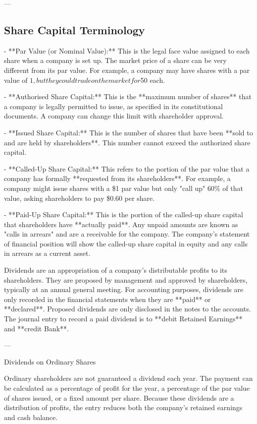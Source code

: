 ---

\subsection{Share Capital Terminology}

- **Par Value (or Nominal Value):** This is the legal face value assigned to each share when a company is set up. The market price of a share can be very different from its par value. For example, a company may have shares with a par value of $1, but they could trade on the market for $50 each.
    
- **Authorised Share Capital:** This is the **maximum number of shares** that a company is legally permitted to issue, as specified in its constitutional documents. A company can change this limit with shareholder approval.
    
- **Issued Share Capital:** This is the number of shares that have been **sold to and are held by shareholders**. This number cannot exceed the authorized share capital.
    
- **Called-Up Share Capital:** This refers to the portion of the par value that a company has formally **requested from its shareholders**. For example, a company might issue shares with a \$1 par value but only "call up" 60\% of that value, asking shareholders to pay \$0.60 per share.
    
- **Paid-Up Share Capital:** This is the portion of the called-up share capital that shareholders have **actually paid**. Any unpaid amounts are known as "calls in arrears" and are a receivable for the company. The company’s statement of financial position will show the called-up share capital in equity and any calls in arrears as a current asset.


Dividends are an appropriation of a company's distributable profits to its shareholders. They are proposed by management and approved by shareholders, typically at an annual general meeting. For accounting purposes, dividends are only recorded in the financial statements when they are **paid** or **declared**. Proposed dividends are only disclosed in the notes to the accounts. The journal entry to record a paid dividend is to **debit Retained Earnings** and **credit Bank**.

---

 Dividends on Ordinary Shares

Ordinary shareholders are not guaranteed a dividend each year. The payment can be calculated as a percentage of profit for the year, a percentage of the par value of shares issued, or a fixed amount per share. Because these dividends are a distribution of profits, the entry reduces both the company's retained earnings and cash balance.

